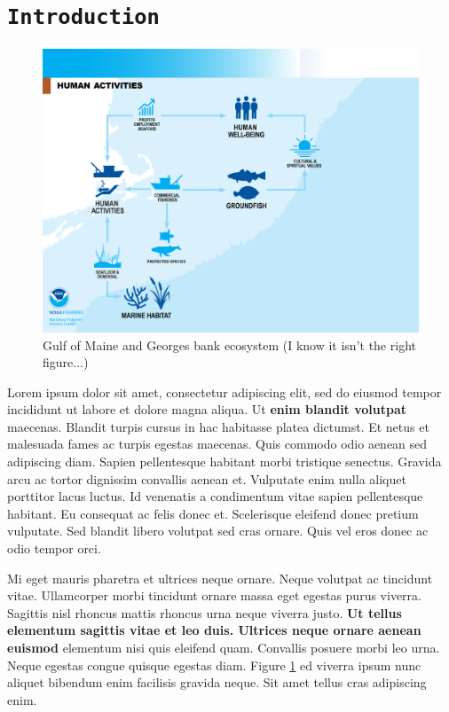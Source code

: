 \documentclass[11pt,]{article}
\title{}
\author{}
\date{}
\begin{document}
\hypertarget{introduction}{%
\section{\texorpdfstring{\texttt{Introduction}}{Introduction}}\label{introduction}}

\begin{figure}
\centering
\includegraphics[width=400pt]{gf_human_activities.png}
\caption{Gulf of Maine and Georges bank ecosystem (I know it isn't the right figure...)}
\label{fig:conceptual}
\end{figure}

Lorem ipsum dolor sit amet, consectetur adipiscing elit, sed do eiusmod
tempor incididunt ut labore et dolore magna aliqua. Ut \textbf{enim
blandit volutpat} maecenas. Blandit turpis cursus in hac habitasse
platea dictumst. Et netus et malesuada fames ac turpis egestas maecenas.
Quis commodo odio aenean sed adipiscing diam. Sapien pellentesque
habitant morbi tristique senectus. Gravida arcu ac tortor dignissim
convallis aenean et. Vulputate enim nulla aliquet porttitor lacus
luctus. Id venenatis a condimentum vitae sapien pellentesque habitant.
Eu consequat ac felis donec et. Scelerisque eleifend donec pretium
vulputate. Sed blandit libero volutpat sed cras ornare. Quis vel eros
donec ac odio tempor orci.

Mi eget mauris pharetra et ultrices neque ornare. Neque volutpat ac
tincidunt vitae. Ullamcorper morbi tincidunt ornare massa eget egestas
purus viverra. Sagittis nisl rhoncus mattis rhoncus urna neque viverra
justo. \textbf{Ut tellus elementum sagittis vitae et leo duis. Ultrices
neque ornare aenean euismod} elementum nisi quis eleifend quam.
Convallis posuere morbi leo urna. Neque egestas congue quisque egestas
diam. Figure \ref{fig:conceptual} ed viverra ipsum nunc aliquet bibendum
enim facilisis gravida neque. Sit amet tellus cras adipiscing enim.
\end{document}
